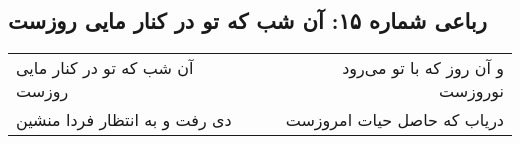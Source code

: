 \begin{center}
\section*{رباعی شماره ۱۵: آن شب که تو در کنار مایی روزست}
\label{sec:015}
\begin{longtable}{l p{0.5cm} r}
آن شب که تو در کنار مایی روزست
&&
و آن روز که با تو می‌رود نوروزست
\\
دی رفت و به انتظار فردا منشین
&&
دریاب که حاصل حیات امروزست
\\
\end{longtable}
\end{center}

